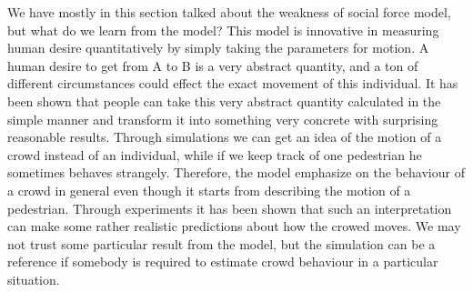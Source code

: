 We have mostly in this section talked about the weakness of social force 
model, but what do we learn from the model? This model is innovative in 
measuring human desire quantitatively by simply taking the parameters for motion. 
A human desire to get from A to B is a very abstract quantity, and a ton of
different circumstances could effect the exact movement of this
individual. It has been shown that people can take this very abstract quantity 
calculated in the simple manner and transform it into something very 
concrete with surprising reasonable results.
Through simulations we can get an idea of the motion of a crowd instead of an 
individual, while if we keep track of one pedestrian he sometimes behaves strangely. 
Therefore, the model emphasize on the behaviour of a crowd in general even though 
it starts from describing the motion of a pedestrian. Through experiments 
it has been shown that such an interpretation can make some rather realistic 
predictions about how the crowed moves. We may not trust some particular result from 
the model, but the simulation can be a reference if somebody is required to estimate 
crowd behaviour in a particular situation.
